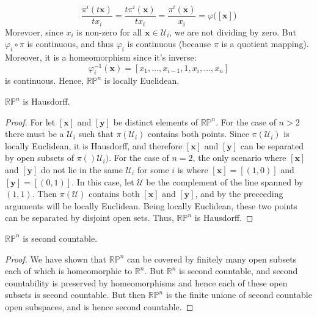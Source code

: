 \begin{example}
\begin{equation}
                    \frac{\pi^{i}(t\mathbf{x})}{tx_{i}}
                    =\frac{t\pi^{i}(\mathbf{x})}{tx_{i}}
                    =\frac{\pi^{i}(\mathbf{x})}{x_{i}}
                    =\varphi\big([\mathbf{x}]\big)
            \end{equation}
            Morevoer, since $x_{i}$ is non-zero for all
            $\mathbf{x}\in\mathcal{U}_{i}$, we are not dividing by zero.
            But $\varphi_{i}\circ\pi$ is continuous, and thus $\varphi_{i}$ is
            continuous (because $\pi$ is a quotient mapping). Moreover, it is a
            homeomorphism since it's inverse:
            \begin{equation}
                \varphi_{i}^{\minus{1}}(\mathbf{x})=
                    [x_{1},\dots,x_{i-1},1,x_{i},\dots,x_{n}]
            \end{equation}
            is continuous. Hence, $\mathbb{RP}^{n}$ is locally Euclidean.
        \end{example}
        \begin{theorem}
            $\mathbb{RP}^{n}$ is Hausdorff.
        \end{theorem}
        \begin{proof}
            For let $[\mathbf{x}]$ and $[\mathbf{y}]$ be distinct elements of
            $\mathbb{RP}^{n}$. For the case of $n>2$ there must be a
            $\mathcal{U}_{i}$ such that $\pi(\mathcal{U}_{i})$ contains both
            points. Since $\pi(\mathcal{U}_{i})$ is locally Euclidean, it is
            Hausdorff, and therefore $[\mathbf{x}]$ and $[\mathbf{y}]$ can be
            separated by open subsets of $\pi()\mathcal{U}_{i})$. For the case
            of $n=2$, the only scenario where $[\mathbf{x}]$ and $[\mathbf{y}]$
            do not lie in the same $\mathcal{U}_{i}$ for some $i$ is where
            $[\mathbf{x}]=[(1,0)]$ and $[\mathbf{y}]=[(0,1)]$. In this case,
            let $\mathcal{U}$ be the complement of the line spanned by
            $(1,1)$. Then $\pi(\mathcal{U})$ contains both $[\mathbf{x}]$ and
            $[\mathbf{y}]$, and by the preceeding arguments will be locally
            Euclidean. Being locally Euclidean, these two points can be
            separated by disjoint open sets. Thus, $\mathbb{RP}^{n}$ is
            Hausdorff.
        \end{proof}
        \begin{theorem}
            $\mathbb{RP}^{n}$ is second countable.
        \end{theorem}
        \begin{proof}
            We have shown that $\mathbb{RP}^{n}$ can be covered by finitely many
            open subsets each of which is homeomorphic to $\mathbb{R}^{n}$.
            But $\mathbb{R}^{n}$ is second countable, and second countability is
            preserved by homeomorphisms and hence each of these open subsets is
            second countable. But then $\mathbb{RP}^{n}$ is the finite unione of
            second countable open subspaces, and is hence second countable.
        \end{proof}
